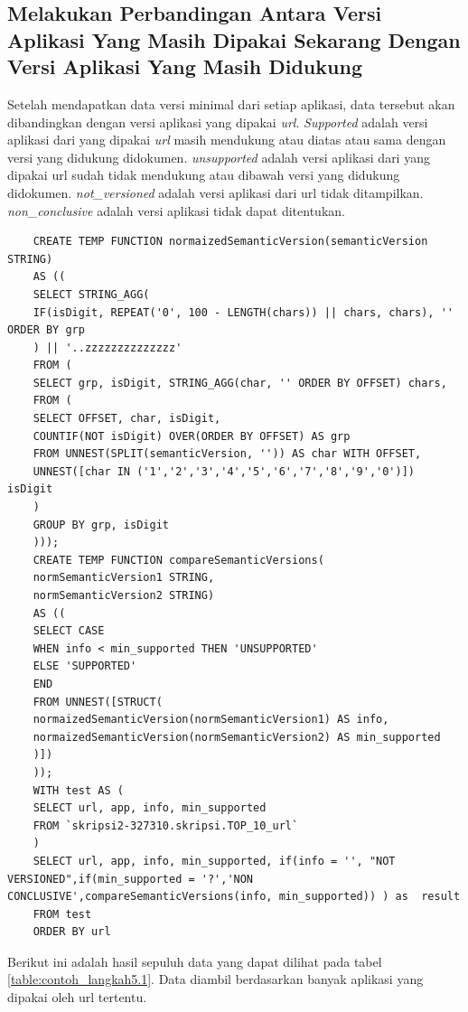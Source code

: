 \subsection{Melakukan Perbandingan Antara Versi Aplikasi Yang Masih Dipakai Sekarang Dengan Versi Aplikasi Yang Masih Didukung}
Setelah mendapatkan data versi minimal dari setiap aplikasi, data tersebut akan dibandingkan dengan versi aplikasi yang dipakai \textit{url}. \textit{Supported} adalah versi aplikasi dari yang dipakai \textit{url} masih mendukung atau diatas atau sama dengan versi yang didukung didokumen. \textit{unsupported} adalah versi aplikasi dari yang dipakai url sudah tidak mendukung atau dibawah versi yang didukung didokumen. \textit{not\_versioned} adalah versi aplikasi dari url tidak ditampilkan. \textit{non\_conclusive} adalah versi aplikasi tidak dapat ditentukan. 
\begin{lstlisting}
	CREATE TEMP FUNCTION normaizedSemanticVersion(semanticVersion STRING) 
	AS ((
	SELECT STRING_AGG(
	IF(isDigit, REPEAT('0', 100 - LENGTH(chars)) || chars, chars), '' ORDER BY grp 
	) || '..zzzzzzzzzzzzzz' 
	FROM (
	SELECT grp, isDigit, STRING_AGG(char, '' ORDER BY OFFSET) chars,
	FROM (
	SELECT OFFSET, char, isDigit,
	COUNTIF(NOT isDigit) OVER(ORDER BY OFFSET) AS grp
	FROM UNNEST(SPLIT(semanticVersion, '')) AS char WITH OFFSET, 
	UNNEST([char IN ('1','2','3','4','5','6','7','8','9','0')]) isDigit
	)
	GROUP BY grp, isDigit
	)));
	CREATE TEMP FUNCTION compareSemanticVersions(
	normSemanticVersion1 STRING, 
	normSemanticVersion2 STRING) 
	AS ((
	SELECT CASE 
	WHEN info < min_supported THEN 'UNSUPPORTED'
	ELSE 'SUPPORTED'
	END
	FROM UNNEST([STRUCT(
	normaizedSemanticVersion(normSemanticVersion1) AS info, 
	normaizedSemanticVersion(normSemanticVersion2) AS min_supported
	)])
	));
	WITH test AS (
	SELECT url, app, info, min_supported	
	FROM `skripsi2-327310.skripsi.TOP_10_url`
	)
	SELECT url, app, info, min_supported, if(info = '', "NOT VERSIONED",if(min_supported = '?','NON CONCLUSIVE',compareSemanticVersions(info, min_supported)) ) as  result
	FROM test 
	ORDER BY url
\end{lstlisting}
Berikut ini adalah hasil sepuluh data yang dapat dilihat pada tabel \ref{table:contoh_langkah5.1}. Data diambil berdasarkan banyak aplikasi yang dipakai oleh url tertentu. 
